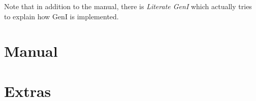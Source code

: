 \documentclass[a4paper,11pt]{report}
\begin{document}
Note that in addition to the manual, there is \textit{Literate GenI}
\cite{literateGeni} which actually tries to explain how GenI is
implemented.


\part{Manual}





\part{Extras}





{


}
\end{document}
